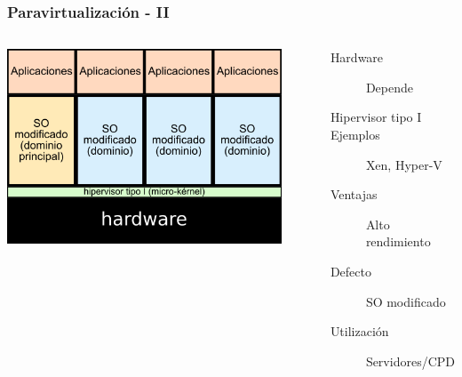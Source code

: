 \documentclass{beamer}
\begin{document}
\begin{frame} \frametitle{Paravirtualización - II}
  \begin{columns}
    \begin{center}
    \includegraphics[width=0.9\textwidth]{paravirt_microkernel.png}      
    \end{center}
    \begin{description}
    \item[Hardware] Depende
    \item[Hipervisor tipo I]
    \item[Ejemplos] Xen, Hyper-V
    \item [Ventajas] Alto rendimiento
    \item[Defecto] SO modificado
    \item[Utilización] Servidores/CPD
    \end{description}
  \end{columns}
\end{frame}
\end{document}
